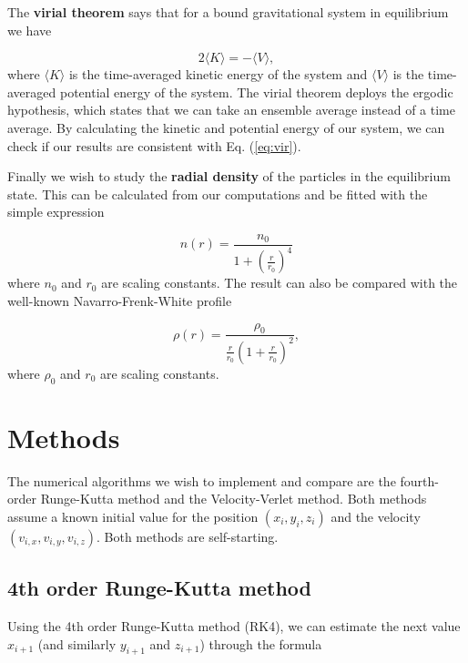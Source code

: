 \documentclass{article}
\begin{document}
\begin{multicols}{2}
The \textbf{virial theorem} says that for a bound gravitational system in equilibrium we have

\begin{equation}\label{eq:vir}
	2 \langle K \rangle = - \langle V \rangle,
\end{equation}
where $\langle K \rangle$ is the time-averaged kinetic energy of the system and $\langle V \rangle$ is the time-averaged potential energy of the system. The virial theorem deploys the ergodic hypothesis, which states that we can take an ensemble average instead of a time average. By calculating the kinetic and potential energy of our system, we can check if our results are consistent with Eq. (\ref{eq:vir}).

Finally we wish to study the \textbf{radial density} of the particles in the equilibrium state. This can be calculated from our computations and be fitted with the simple expression

\begin{equation}\label{eq:simple_fit}
	n(r) = \frac{n_0}{1 + (\frac{r}{r_0})^4}
\end{equation}
where $n_0$ and $r_0$ are scaling constants. The result can also be compared with the well-known Navarro-Frenk-White profile

\begin{equation}\label{eq:NFW}
	\rho(r) = \frac{\rho_0}{  \frac{r}{r_0} (1 + \frac{r}{r_0})^2  },
\end{equation}
where $\rho_0$ and $r_0$ are scaling constants. 


\section{Methods}\label{sec:methods}

The numerical algorithms we wish to implement and compare are the fourth-order Runge-Kutta method and the Velocity-Verlet method. Both methods assume a known initial value for the position $(x_i,y_i,z_i)$ and the velocity $(v_{i,x},v_{i,y},v_{i,z})$. Both methods are self-starting. 


\subsection{4th order Runge-Kutta method}\label{sec:RK4}
Using the 4th order Runge-Kutta method (RK4), we can estimate the next value $x_{i+1}$ (and similarly $y_{i+1}$ and $z_{i+1}$) through the formula


\end{multicols}
\end{document}
